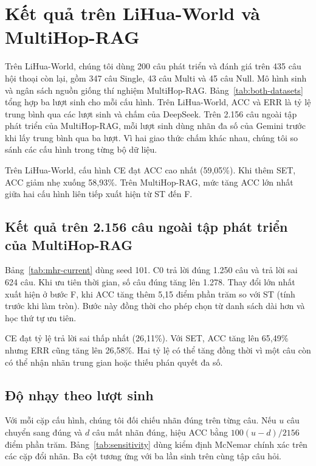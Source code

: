 \section{Kết quả trên LiHua-World và MultiHop-RAG}
Trên LiHua-World, chúng tôi dùng 200 câu phát triển và đánh giá trên 435 câu hội thoại còn lại, gồm 347 câu Single, 43 câu Multi và 45 câu Null. Mô hình sinh và ngân sách nguồn giống thí nghiệm MultiHop-RAG. Bảng~\ref{tab:both-datasets} tổng hợp ba lượt sinh cho mỗi cấu hình. Trên LiHua-World, ACC và ERR là tỷ lệ trung bình qua các lượt sinh và chấm của DeepSeek. Trên 2.156 câu ngoài tập phát triển của MultiHop-RAG, mỗi lượt sinh dùng nhãn đa số của Gemini trước khi lấy trung bình qua ba lượt. Vì hai giao thức chấm khác nhau, chúng tôi so sánh các cấu hình trong từng bộ dữ liệu.
\begin{table}[htbp]\centering
\caption{ACC và ERR của năm cấu hình trên hai bộ dữ liệu, tính theo phần trăm. Chữ đậm đánh dấu kết quả tốt nhất trong mỗi cột.}
\label{tab:both-datasets}

\end{table}

Trên LiHua-World, cấu hình CE đạt ACC cao nhất (59,05\%). Khi thêm SET, ACC giảm nhẹ xuống 58,93\%. Trên MultiHop-RAG, mức tăng ACC lớn nhất giữa hai cấu hình liên tiếp xuất hiện từ ST đến F.

\subsection{Kết quả trên 2.156 câu ngoài tập phát triển của MultiHop-RAG}
Bảng~\ref{tab:mhr-current} dùng seed 101. C0 trả lời đúng 1.250 câu và trả lời sai 624 câu. Khi ưu tiên thời gian, số câu đúng tăng lên 1.278. Thay đổi lớn nhất xuất hiện ở bước F, khi ACC tăng thêm 5,15 điểm phần trăm so với ST (tính trước khi làm tròn). Bước này đồng thời cho phép chọn từ danh sách dài hơn và học thứ tự ưu tiên.
\begin{table}[htbp]\centering
\caption{ACC và ERR trên cùng 2.156 câu, tính theo phần trăm.}
\label{tab:mhr-current}
\resizebox{\linewidth}{!}{}
\end{table}

CE đạt tỷ lệ trả lời sai thấp nhất (26,11\%). Với SET, ACC tăng lên 65,49\% nhưng ERR cũng tăng lên 26,58\%. Hai tỷ lệ có thể tăng đồng thời vì một câu còn có thể nhận nhãn trung gian hoặc thiếu phán quyết đa số.

\subsection{Độ nhạy theo lượt sinh}
Với mỗi cặp cấu hình, chúng tôi đối chiếu nhãn đúng trên từng câu. Nếu $u$ câu chuyển sang đúng và $d$ câu mất nhãn đúng, hiệu ACC bằng $100(u-d)/2156$ điểm phần trăm. Bảng~\ref{tab:sensitivity} dùng kiểm định McNemar chính xác trên các cặp đổi nhãn. Ba cột tương ứng với ba lần sinh trên cùng tập câu hỏi.
\begin{table}[htbp]\centering\small
\caption{Hiệu ACC theo điểm phần trăm trên 2.156 câu. Trong ngoặc là giá trị $p$ của phép so ghép cặp ở từng seed.}
\label{tab:sensitivity}

\end{table}

